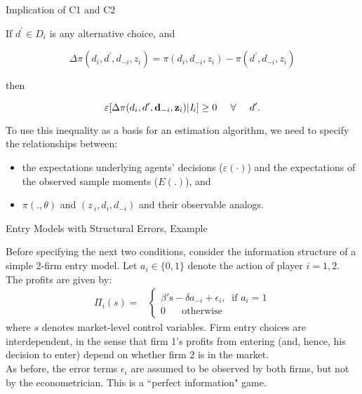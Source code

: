 \begin{frame}{Implication of C1 and C2}

If $d^{\prime }\in D_{i}$ is any alternative choice, and 

\begin{equation}
\Delta \pi (d_{i},d^{\prime },d_{-i},z_{i})=\pi (d_{i},d_{-i},z_{i})-\pi
(d^{\prime },d_{-i},z_{i})
\end{equation}

then%

\begin{equation*}
\varepsilon[ \Delta \pi (d_{i},d^{\prime },\mathbf{d}_{-i},\mathbf{z}_{i})|\mathit{I}_{i}] \geq 0 \text{ \hspace{0.1in}   } \forall  \text{   \hspace{0.1in}   }d'.
\end{equation*}

To use this inequality as a basis for an estimation algorithm, we need to specify the
relationships between:

\begin{itemize}
\item the expectations underlying agents' decisions (\large{$\varepsilon(\cdot)$}) \normalsize and the expectations of the observed sample moments ($E(.)$), and 

\item $\pi (.,\theta )$ and $(z\,_{i},d_{i},d_{-i})$ and their observable analogs.
\end{itemize}


\end{frame}

\begin{frame}{Entry Models with Structural Errors, Example}

\vspace{2mm}
Before specifying the next two conditions, consider the information structure of a simple 2-firm entry model. Let $a_i \in \{0,1 \}$ denote the action of player $i = 1,2$. The profits are given by:
\begin{equation*}
\begin{split}
\Pi_i (s) =& \left \{
\begin{array}{l} 
\beta' \text{s} - \delta a_{-i} + \epsilon_i , \;\; \text{if } a_i = 1 \\
0 \;\; \;\; \;\; \text{otherwise}
\end{array}
\right. 
\end{split}
\end{equation*}
where $s$ denotes market-level control variables. 
\vfill
Firm entry choices are interdependent, in the sense that firm 1's profits from entering (and, hence, his decision to enter) depend on whether firm 2 is in the market. \\
\vfill
As before, the error terms $\epsilon_i$ are assumed to be observed by both firms, but not by the econometrician. This is a ``perfect information" game. 
\end{frame}

